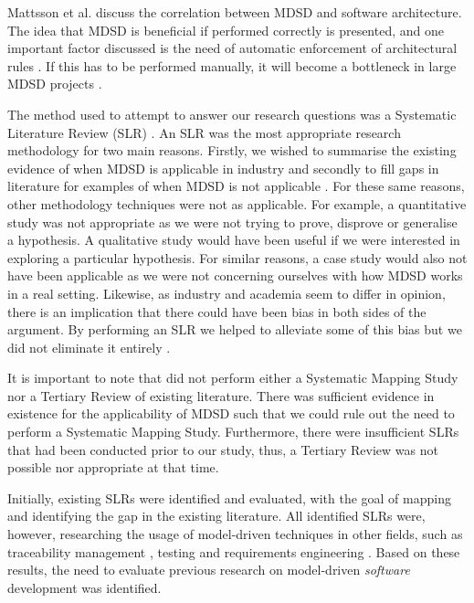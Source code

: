 \documentclass[10pt,twocolumn]{article}
\begin{document}
Mattsson et al. \cite{mattsson2009linking} discuss the correlation between MDSD and software architecture. The idea that MDSD is beneficial if performed correctly is presented, and one important factor discussed is the need of automatic enforcement of architectural rules \cite{mattsson2009linking}. If this has to be performed manually, it will become a bottleneck in large MDSD projects \cite{mattsson2009linking}.




The method used to attempt to answer our research questions was a Systematic Literature Review (SLR) \cite{kitchenham2007guidelines}. An SLR was the most appropriate research methodology for two main reasons. Firstly, we wished to summarise the existing evidence of when MDSD is applicable in industry and secondly to fill gaps in literature for examples of when MDSD is not applicable \cite{kitchenham2007guidelines}. For these same reasons, other methodology techniques were not as applicable. For example, a quantitative study was not appropriate as we were not trying to prove, disprove or generalise a hypothesis. A qualitative study would have been useful if we were interested in exploring a particular hypothesis. For similar reasons, a case study would also not have been applicable as we were not concerning ourselves with how MDSD works in a real setting. Likewise, as industry and academia seem to differ in opinion, there is an implication that there could have been bias in both sides of the argument. By performing an SLR we helped to alleviate some of this bias but we did not eliminate it entirely \cite{kitchenham2007guidelines}.

It is important to note that did not perform either a Systematic Mapping Study nor a Tertiary Review of \cite{kitchenham2007guidelines} existing literature. There was sufficient evidence in existence for the applicability of MDSD such that we could rule out the need to perform a Systematic Mapping Study. Furthermore, there were insufficient SLRs that had been conducted prior to our study, thus, a Tertiary Review \cite{kitchenham2007guidelines} was not possible nor appropriate at that time.


Initially, existing SLRs were identified and evaluated, with the goal of mapping and identifying the gap in the existing literature. All identified SLRs \cite{santiago2012model} \cite{dias2007survey} \cite{loniewski2010systematic} \cite{nicolas2009generation} were, however, researching the usage of model-driven techniques in other fields, such as traceability management \cite{santiago2012model}, testing \cite{dias2007survey} and requirements engineering \cite{loniewski2010systematic} \cite{nicolas2009generation}. Based on these results, the need to evaluate previous research on model-driven \textit{software} development was identified. 
\end{document}
